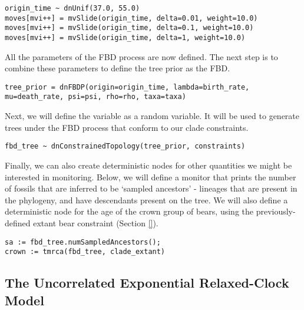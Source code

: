 {\tt \begin{snugshade*}
\begin{lstlisting}
origin_time ~ dnUnif(37.0, 55.0)
moves[mvi++] = mvSlide(origin_time, delta=0.01, weight=10.0)
moves[mvi++] = mvSlide(origin_time, delta=0.1, weight=10.0)
moves[mvi++] = mvSlide(origin_time, delta=1, weight=10.0)
\end{lstlisting}
\end{snugshade*}}

All the parameters of the FBD process are now defined. 
The next step is to combine these parameters to define the tree prior as the FBD.

{\tt \begin{snugshade*}
\begin{lstlisting}
tree_prior = dnFBDP(origin=origin_time, lambda=birth_rate, mu=death_rate, psi=psi, rho=rho, taxa=taxa)
\end{lstlisting}
\end{snugshade*}}

Next, we will define the  variable as a random variable. 
It will be used to generate trees under the FBD process that conform to our clade constraints. 

{\tt \begin{snugshade*}
\begin{lstlisting}
fbd_tree ~ dnConstrainedTopology(tree_prior, constraints) 
\end{lstlisting}
\end{snugshade*}}

Finally, we can also create deterministic nodes for other quantities we might be interested in monitoring. 
Below, we will define a monitor that prints the number of fossils that are inferred to be `sampled ancestors' - lineages that are present in the phylogeny, and have descendants present on the tree. 
We will also define a deterministic node for the age of the crown group of bears, using the previously-defined extant bear constraint (Section \ref{}).

{\tt \begin{snugshade*}
\begin{lstlisting}
sa := fbd_tree.numSampledAncestors();
crown := tmrca(fbd_tree, clade_extant)
\end{lstlisting}
\end{snugshade*}}

\bigskip

\subsection{The Uncorrelated Exponential Relaxed-Clock Model}\label{subsect:RB-ModelUCExp}


